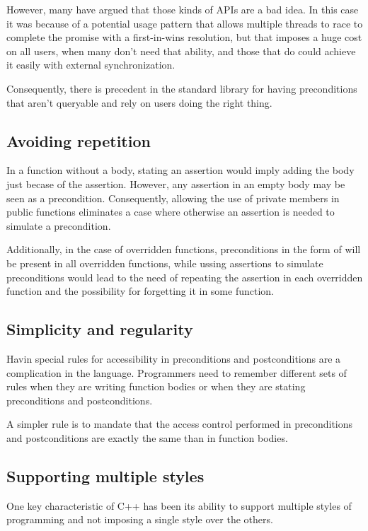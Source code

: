 However, many have argued that those kinds of APIs are a bad idea. In this case
it was because of a potential usage pattern that allows multiple threads to race
to complete the promise with a first-in-wins resolution, but that imposes a huge
cost on all users, when many don’t need that ability, and those that do could
achieve it easily with external synchronization.

Consequently, there is precedent in the standard library for having
preconditions that aren’t queryable and rely on users doing the right thing.

\subsection{Avoiding repetition}

In a function without a body, stating an assertion would imply adding the body
just becase of the assertion. However, any assertion in an empty body may be
seen as a precondition. Consequently, allowing the use of private members in
public functions eliminates a case where otherwise an assertion is needed to
simulate a precondition.

Additionally, in the case of overridden functions, preconditions in the form of
\cppid{[[}\cppid{]]} will be present in all overridden
functions, while ussing assertions to simulate preconditions would lead to the
need of repeating the assertion in each overridden function and the possibility
for forgetting it in some function. 

\subsection{Simplicity and regularity}

Havin special rules for accessibility in preconditions and postconditions are a
complication in the language. Programmers need to remember different sets of
rules when they are writing function bodies or when they are stating
preconditions and postconditions.

A simpler rule is to mandate that the access control performed in preconditions
and postconditions are exactly the same than in function bodies.

\subsection{Supporting multiple styles}

One key characteristic of C++ has been its ability to support multiple styles of
programming and not imposing a single style over the others.

